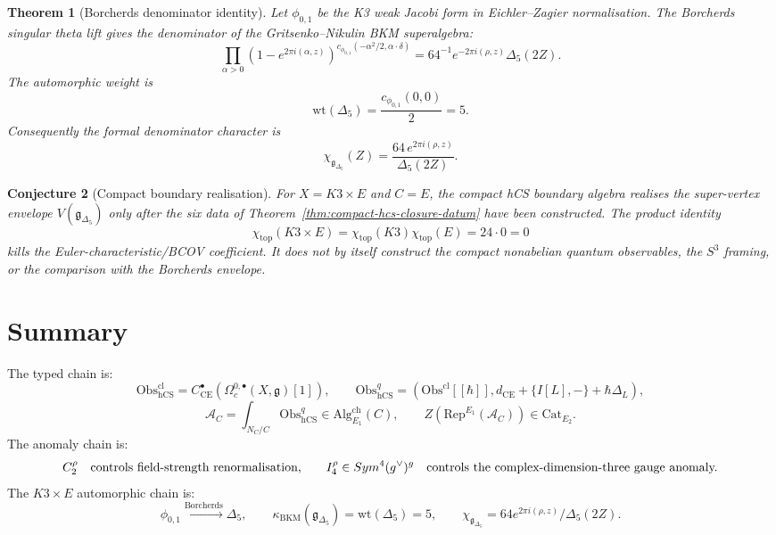 \documentclass[11pt]{article}
\newtheorem{theorem}{Theorem}
\newtheorem{conjecture}[theorem]{Conjecture}
\theoremstyle{definition}
\theoremstyle{remark}
\newcommand{\fg}{\mathfrak{g}}
\newcommand{\hCS}{\mathrm{hCS}}
\newcommand{\Obs}{\mathrm{Obs}}
\newcommand{\CE}{\mathrm{CE}}
\newcommand{\Sym}{\mathrm{Sym}}
\newcommand{\Rep}{\mathrm{Rep}}
\newcommand{\kBKM}{\kappa_{\mathrm{BKM}}}
\newcommand{\Eone}{E_1}
\newcommand{\Etwo}{E_2}
\begin{document}
\begin{theorem}[Borcherds denominator identity]
\label{thm:delta5-denominator}
Let \(\phi_{0,1}\) be the K3 weak Jacobi form in Eichler--Zagier
normalisation. The Borcherds singular theta lift gives the denominator
of the Gritsenko--Nikulin BKM superalgebra:
\[
  \prod_{\alpha>0}
  \left(1-e^{2\pi i(\alpha,z)}\right)^{c_{\phi_{0,1}}
  (-\alpha^2/2,\alpha\cdot\delta)}
  =
  64^{-1}e^{-2\pi i(\rho,z)}\Delta_5(2Z).
\]
The automorphic weight is
\[
  \mathrm{wt}(\Delta_5)
  =
  \frac{c_{\phi_{0,1}}(0,0)}{2}
  =
  5.
\]
Consequently the formal denominator character is
\[
  \chi_{\fg_{\Delta_5}}(Z)
  =
  \frac{64\,e^{2\pi i(\rho,z)}}{\Delta_5(2Z)}.
\]
\end{theorem}

\begin{conjecture}[Compact boundary realisation]
\label{conj:k3e-boundary-realisation}
For \(X=K3\times E\) and \(C=E\), the compact hCS boundary algebra
realises the super-vertex envelope \(V(\fg_{\Delta_5})\) only after the
six data of Theorem~\ref{thm:compact-hcs-closure-datum} have been
constructed. The product identity
\[
  \chi_{\mathrm{top}}(K3\times E)=\chi_{\mathrm{top}}(K3)\chi_{\mathrm{top}}(E)
  =
  24\cdot 0=0
\]
kills the Euler-characteristic/BCOV coefficient. It does not by itself
construct the compact nonabelian quantum observables, the \(S^3\)
framing, or the comparison with the Borcherds envelope.
\end{conjecture}

\section{Summary}
\label{sec:summary}

The typed chain is:
\[
  \Obs^{\mathrm{cl}}_{\hCS}
  =
  C^\bullet_{\CE}(\Omega^{0,\bullet}_c(X,\fg)[1]),
  \qquad
  \Obs^q_{\hCS}
  =
  (\Obs^{\mathrm{cl}}[[\hbar]],d_{\CE}+\{I[L],-\}+\hbar\Delta_L),
\]
\[
  \mathcal A_C=\int_{N_C/C}\Obs^q_{\hCS}\in
  \mathrm{Alg}_{\Eone}^{\mathrm{ch}}(C),
  \qquad
  Z(\Rep^{\Eone}(\mathcal A_C))\in\mathrm{Cat}_{\Etwo}.
\]
The anomaly chain is:
\[
  C_2^\rho
  \quad\hbox{controls field-strength renormalisation,}\qquad
  I_4^\rho\in\Sym^4(\fg^\vee)^\fg
  \quad\hbox{controls the complex-dimension-three gauge anomaly.}
\]
The \(K3\times E\) automorphic chain is:
\[
  \phi_{0,1}
  \xrightarrow{\mathrm{Borcherds}}
  \Delta_5,
  \qquad
  \kBKM(\fg_{\Delta_5})=\mathrm{wt}(\Delta_5)=5,
  \qquad
  \chi_{\fg_{\Delta_5}}=64e^{2\pi i(\rho,z)}/\Delta_5(2Z).
\]
\end{document}
